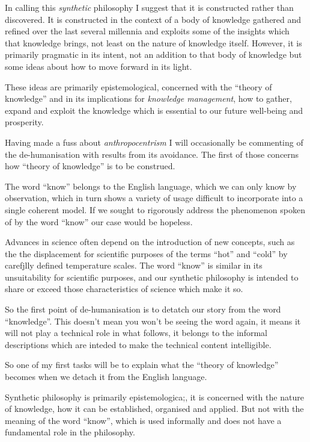 \documentclass[10pt,titlepage]{book}
\begin{document}
In calling this \emph{synthetic} philosophy I suggest that it is constructed rather than discovered.
It is constructed in the context of a body of knowledge gathered and refined over the last several millennia and exploits some of the insights which that knowledge brings, not least on the nature of knowledge itself.
However, it is primarily pragmatic in its intent, not an addition to that body of knowledge but some ideas about how to move forward in its light.


These ideas are primarily epistemological, concerned with the ``theory of knowledge'' and in its implications for \emph{knowledge management}, how to gather, expand and exploit the knowledge which is essential to our future well-being and prosperity.

Having made a fuss about \emph{anthropocentrism} I will occasionally be commenting of the de-humanisation with results from its avoidance.
The first of those concerns how ``theory of knowledge'' is to be construed.

The word ``know'' belongs to the English language, which we can only know by observation, which in turn shows a variety of usage difficult to incorporate into a single coherent model.
If we sought to rigorously address the phenomenon spoken of by the word ``know'' our case would be hopeless.

Advances in science often depend on the introduction of new concepts, such as the the displacement for scientific purposes of the terms ``hot'' and ``cold'' by carefjlly defined temperature scales.
The word ``know'' is similar in its unsuitability for scientific purposes, and our synthetic philosophy is intended to share or exceed those characteristics of science which make it so.

So the first point of de-humanisation is to detatch our story from the word ``knowledge''.
This doesn't mean you won't be seeing the word again, it means it will not play a technical role in what follows, it belongs to the informal descriptions which are inteded to make the technical content intelligible.

So one of my first tasks will be to explain what the ``theory of knowledge'' becomes when we detach it from the English language.



Synthetic philosophy is primarily epistemologica;, it is concerned with the nature of knowledge, how it can be established, organised and applied.
But not with the meaning of the word ``know'', which is used informally and does not have a fundamental role in the philosophy.
\end{document}

